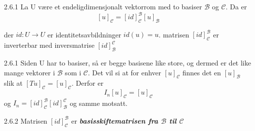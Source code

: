 \documentclass[a4paper,norsk]{article}
\begin{document}
\begin{propositionbox}{2.6.1}{}
La U være et endeligdimensjonalt vektorrom med to basiser $ \mathcal{B} $ og $ \mathcal{C} $. Da er 
\[
    \left[ u \right] _{\mathcal{C}} = \left[ id \right] _{\mathcal{C}}^{\mathcal{B}} \left[ u \right] _{\mathcal{B}}
\]

der $ id: U \to U $ er identitetsavbildninger $ id \left( u \right) = u $. matrisen $\left[ id \right] _{\mathcal{C}}^{\mathcal{B}} $ er inverterbar med inversmatrise $\left[ id \right] _{\mathcal{B}}^{\mathcal{C}} $

\begin{proofbox}{2.6.1}{}
Siden U har to basiser, så er begge basisene like store, og dermed er det like mange vektorer i $ \mathcal{B} $ som i $ \mathcal{C} $. Det vil si at for enhver $ \left[ u \right] _{\mathcal{C}} $ finnes det en $ \left[ u \right] _{\mathcal{B}} $ slik at $ \left[ Tu \right] _{\mathcal{C}} = \left[ u \right] _{\mathcal{C}} $. Derfor er 
\[
    I_n \left[ u \right] _{\mathcal{C}} = \left[ u \right] _{\mathcal{C}}
\]
og $ I_n = \left[ id \right] _{\mathcal{C}}^{\mathcal{B}} \left[ id \right] _{\mathcal{B}}^{\mathcal{C}} $ og samme motsatt.  
\end{proofbox}
\end{propositionbox}



\begin{definitionbox}{2.6.2}{}
Matrisen $\left[ id \right] _{\mathcal{C}}^{\mathcal{B}} $ er \textbf{\textit{basisskiftematrisen fra $ \mathcal{B} $ til $ \mathcal{C} $  }}
\end{definitionbox}
\end{document}
